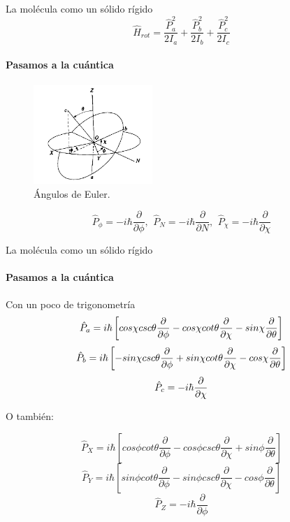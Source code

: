 \documentclass[a4paper]{beamer}
\begin{document}
\begin{frame}{La molécula como un sólido rígido}
\begin{equation*}
\hat H_{rot}=\frac{\hat P_a^2}{2I_a}+\frac{\hat P_b^2}{2I_b}+\frac{\hat P_c^2}{2I_c}
\end{equation*}
\framesubtitle{Pasamos a la cuántica}
\begin{figure}
\includegraphics[width=0.4\textwidth]{Angulos_Euler.png}
\caption{Ángulos de Euler. }
\label{euler}
\end{figure}
$$
\hat P_{\phi}=-i\hbar\frac{\partial}{\partial \phi},\,\ \hat P_{N}=-i\hbar\frac{\partial}{\partial N},\,\ \hat P_{\chi}=-i\hbar\frac{\partial}{\partial \chi}
$$
\end{frame}

\begin{frame}{La molécula como un sólido rígido}
\framesubtitle{Pasamos a la cuántica}
Con un poco de trigonometría
\begin{equation*}
{\tiny\hat P_a = i\hbar \left[cos\chi csc\theta \frac{\partial}{\partial \phi} - cos\chi cot\theta \frac{\partial}{\partial \chi} - sin\chi \frac{\partial}{\partial \theta} \right]}
\end{equation*}
\begin{equation*}
\tiny\hat P_b = i\hbar \left[-sin\chi csc\theta \frac{\partial}{\partial \phi} + sin\chi cot\theta \frac{\partial}{\partial \chi} - cos\chi \frac{\partial}{\partial \theta} \right]
\end{equation*}
\begin{equation*}
\tiny\hat P_c = -i\hbar \frac{\partial}{\partial\chi}
\end{equation*}

O también:

\begin{equation*}
\hat P_X = i\hbar \left[cos\phi cot\theta \frac{\partial}{\partial \phi} - cos\phi csc\theta \frac{\partial}{\partial \chi} + sin\phi \frac{\partial}{\partial \theta} \right]
\end{equation*}
\begin{equation*}
\hat P_Y = i\hbar \left[sin\phi cot\theta \frac{\partial}{\partial \phi} - sin\phi csc\theta \frac{\partial}{\partial \chi} - cos\phi \frac{\partial}{\partial \theta} \right]
\end{equation*}
\begin{equation*}
\hat P_Z = -i\hbar\frac{\partial}{\partial\phi} 
\end{equation*}
\end{frame}
\end{document}
